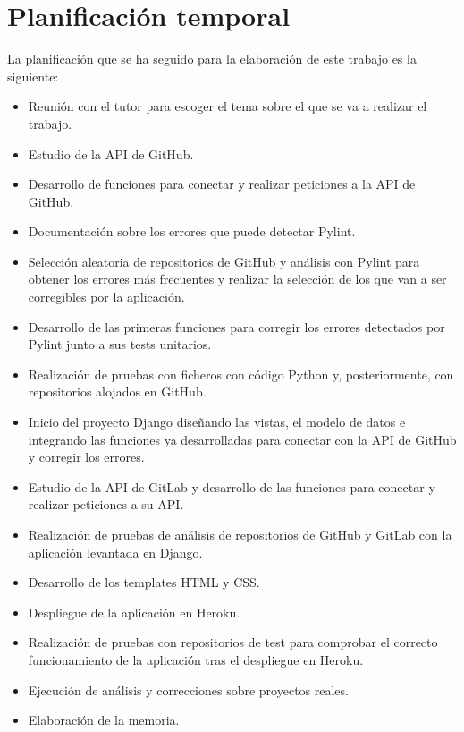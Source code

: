 \documentclass[a4paper, 12pt]{book}
\begin{document}
\section{Planificación temporal}
\label{sec:planificacion-temporal}
La planificación que se ha seguido para la elaboración de este trabajo es la siguiente:
\begin{itemize}
	\item Reunión con el tutor para escoger el tema sobre el que se va a realizar el trabajo.
	\item Estudio de la API de GitHub.
	\item Desarrollo de funciones para conectar y realizar peticiones a la API de GitHub.
	\item Documentación sobre los errores que puede detectar Pylint.
	\item Selección aleatoria de repositorios de GitHub y análisis con Pylint para obtener los errores más frecuentes y realizar la selección de los que van a ser corregibles por la aplicación.
	\item Desarrollo de las primeras funciones para corregir los errores detectados por Pylint junto a sus tests unitarios.
	\item Realización de pruebas con ficheros con código Python y, posteriormente, con repositorios alojados en GitHub.
	\item Inicio del proyecto Django diseñando las vistas, el modelo de datos e integrando las funciones ya desarrolladas para conectar con la API de GitHub y corregir los errores.
	\item Estudio de la API de GitLab y desarrollo de las funciones para conectar y realizar peticiones a su API.
	\item Realización de pruebas de análisis de repositorios de GitHub y GitLab con la aplicación levantada en Django.
	\item Desarrollo de los templates HTML y CSS.
	\item Despliegue de la aplicación en Heroku.
	\item Realización de pruebas con repositorios de test para comprobar el correcto funcionamiento de la aplicación tras el despliegue en Heroku.
	\item Ejecución de análisis y correcciones sobre proyectos reales.
	\item Elaboración de la memoria.
\end{itemize} 


\end{document}

